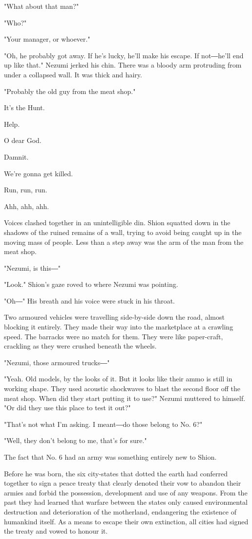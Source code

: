 "What about that man?"

"Who?"

"Your manager, or whoever."

"Oh, he probably got away. If he's lucky, he'll make his escape. If
not―he'll end up like that." Nezumi jerked his chin. There was a bloody
arm protruding from under a collapsed wall. It was thick and hairy.

"Probably the old guy from the meat shop."

It's the Hunt.

Help.

O dear God.

Damnit.

We're gonna get killed.

Run, run, run.

Ahh, ahh, ahh.

Voices clashed together in an unintelligible din. Shion squatted down in
the shadows of the ruined remains of a wall, trying to avoid being
caught up in the moving mass of people. Less than a step away was the
arm of the man from the meat shop.

"Nezumi, is this―"

"Look." Shion's gaze roved to where Nezumi was pointing.

"Oh―" His breath and his voice were stuck in his throat.

Two armoured vehicles were travelling side-by-side down the road, almost
blocking it entirely. They made their way into the marketplace at a
crawling speed. The barracks were no match for them. They were like
paper-craft, crackling as they were crushed beneath the wheels.

"Nezumi, those armoured trucks―"

"Yeah. Old models, by the looks of it. But it looks like their ammo is
still in working shape. They used acoustic shockwaves to blast the
second floor off the meat shop. When did they start putting it to use?"
Nezumi muttered to himself. "Or did they use this place to test it out?"

"That's not what I'm asking. I meant―do those belong to No. 6?"

"Well, they don't belong to me, that's for sure."

The fact that No. 6 had an army was something entirely new to Shion.

Before he was born, the six city-states that dotted the earth had
conferred together to sign a peace treaty that clearly denoted their vow
to abandon their armies and forbid the possession, development and use
of any weapons. From the past they had learned that warfare between the
states only caused environmental destruction and deterioration of the
motherland, endangering the existence of humankind itself. As a means to
escape their own extinction, all cities had signed the treaty and vowed
to honour it.

